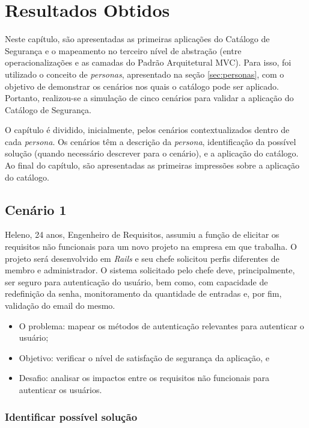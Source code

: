 \chapter{Resultados Obtidos}
\label{chap:resultadosObtidos}

Neste capítulo, são apresentadas as primeiras aplicações do Catálogo de Segurança e o mapeamento no terceiro nível de abstração (entre operacionalizações e as camadas do Padrão Arquitetural MVC). Para isso, foi utilizado o conceito de \textit{personas}, apresentado na seção \ref{sec:personas}, com o objetivo de demonstrar os cenários nos quais o catálogo pode ser aplicado. Portanto, realizou-se a simulação de cinco cenários para validar a aplicação do Catálogo de Segurança. 

O capítulo é dividido, inicialmente, pelos cenários contextualizados dentro de cada \textit{persona}. Os cenários têm a descrição da \textit{persona}, identificação da possível solução (quando necessário descrever para o cenário), e a aplicação do catálogo. Ao final do capítulo, são apresentadas as primeiras impressões sobre a aplicação do catálogo.  


\section{Cenário 1}
\label{subsec:persona1}

Heleno, 24 anos, Engenheiro de Requisitos, assumiu a função de elicitar os requisitos não funcionais para um novo projeto na empresa em que trabalha. O projeto será desenvolvido em \textit{Rails} e seu chefe solicitou perfis diferentes de membro e administrador. O sistema solicitado pelo chefe deve, principalmente, ser seguro para autenticação do usuário, bem como, com capacidade de redefinição da senha, monitoramento da quantidade de entradas e, por fim, validação do email do mesmo.

\begin{itemize}
	\item O problema: mapear os métodos de autenticação relevantes para autenticar o usuário; 
	\item Objetivo: verificar o nível de satisfação de segurança da aplicação, e
	\item Desafio: analisar os impactos entre os requisitos não funcionais para autenticar os usuários.
\end{itemize}


\subsection{Identificar possível solução}

